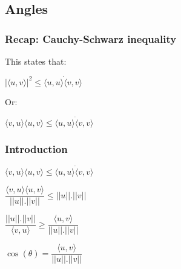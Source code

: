 
\subsection{Angles}

\subsubsection{Recap: Cauchy-Schwarz inequality}

This states that:

\(|\langle u,v\rangle |^2 \le \langle u, u\rangle \dot \langle v, v\rangle \)

Or:

\(\langle v,u\rangle\langle u,v\rangle \le \langle u, u\rangle \dot \langle v, v\rangle \)

\subsubsection{Introduction}

\(\langle v,u\rangle\langle u,v\rangle \le \langle u, u\rangle \dot \langle v, v\rangle \)

\(\dfrac{\langle v,u\rangle\langle u,v\rangle}{||u||.||v||} \le ||u||.||v||\)

\(\dfrac{||u||.||v||}{\langle v,u\rangle} \ge \dfrac{\langle u,v\rangle}{||u||.||v||}\)

\(\cos (\theta )=\dfrac{\langle u,v\rangle }{||u||.||v||}\)

